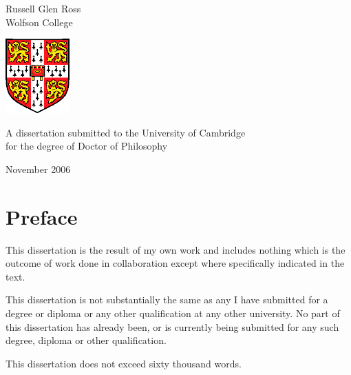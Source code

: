 
\pagestyle{empty}
\begin{titlepage}
\begin{center}
\vspace*{\fill}

\huge
\thesistitlebig

\vfill
\vfill

\huge
Russell Glen Ross\\[6mm]
\large
Wolfson College

\vfill
\includegraphics[width=70pt]{eps/camshield}
\vfill

\large
A dissertation submitted to the University of Cambridge\\
for the degree of Doctor of Philosophy

\vfill

November 2006

\vspace*{\fill}
\end{center}
\end{titlepage}
\cleardoublepage



\chapter*{Preface}

{
\parskip 10pt

\noindent This dissertation is the result of my own work and includes nothing which is the outcome of work done in collaboration except where specifically indicated in the text.

\noindent This dissertation is not substantially the same as any I have submitted for a degree or diploma or any other qualification at any other university. No part of this dissertation has already been, or is currently being submitted for any such degree, diploma or other qualification.

\noindent This dissertation does not exceed sixty thousand words.
}
\vfill

